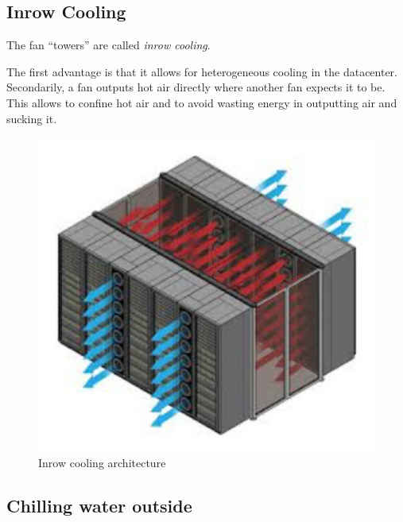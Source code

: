 \subsection{Inrow Cooling}
\begin{paracol}{2}
   \colfill
   The fan ``towers'' are called \textit{inrow cooling}.

   The first advantage is that it allows for heterogeneous cooling in the datacenter.
   Secondarily, a fan outputs hot air directly where another fan expects it to be.
   This allows to confine hot air and to avoid wasting energy in outputting air and sucking it.

   \colfill
   \switchcolumn
\begin{figure}[htbp]
   \centering
   \includegraphics{images/inrow_cooling.png}
   \caption{Inrow cooling architecture}
   \label{fig:inrow_cooling}
\end{figure}
\end{paracol}

\subsection{Chilling water outside}

